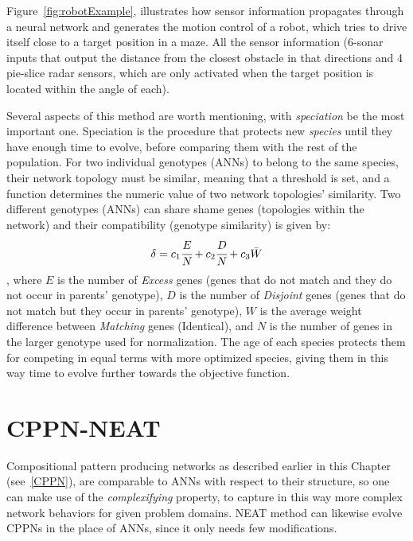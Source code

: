Figure~\ref{fig:robotExample}, illustrates how sensor information propagates through a neural network and generates the motion control of a robot, which tries to drive itself close to a target position in a maze. All the sensor information (6-sonar inputs that output the distance from the closest obstacle in that directions and 4 pie-slice radar sensors, which are only activated when the target position is located within the angle of each).

Several aspects of this method are worth mentioning, with \emph{speciation} be the most important one. Speciation is the procedure that protects new \emph{species} until they have enough time to evolve, before comparing them with the rest of the population. For two individual genotypes (ANNs) to belong to the same species, their network topology must be similar, meaning that a threshold is set, and a function determines the numeric value of two network topologies' similarity. Two different genotypes (ANNs) can share shame genes (topologies within the network) and their compatibility (genotype similarity) is given by:
\begin{equation}
\label{CompatibilityEquation}
\delta = c_1 \cfrac{E}{N} + c_2 \cfrac{D}{N} + c_3 \bar{W}
\end{equation}
, where $E$ is the number of \emph{Excess} genes (genes that do not match and they do not occur in parents' genotype), $D$ is the number of \emph{Disjoint} genes (genes that do not match but they occur in parents' genotype), $W$ is the average weight difference between \emph{Matching} genes (Identical), and $N$ is the number of genes in the larger genotype used for normalization.
The age of each species protects them for competing in equal terms with more optimized species, giving them in this way time to evolve further towards the objective function.



\section{CPPN-NEAT}

Compositional pattern producing networks as described earlier in this Chapter (see~\ref{CPPN}), are comparable to ANNs with respect to their structure, so one can make use of the \emph{complexifying} property, to capture in this way more complex network behaviors for given problem domains. NEAT method can likewise evolve CPPNs in the place of ANNs, since it only needs few modifications. 

